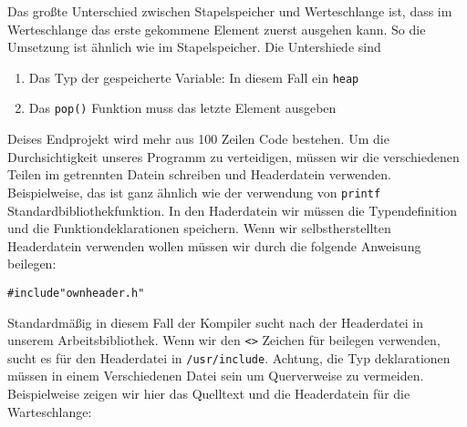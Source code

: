 Das großte Unterschied zwischen Stapelspeicher und 
Werteschlange ist, dass im Werteschlange das erste gekommene Element zuerst ausgehen kann. 
So die Umsetzung ist ähnlich wie im Stapelspeicher. Die Untershiede sind
\begin{enumerate}
\item Das Typ der gespeicherte Variable: In diesem Fall ein \texttt{heap}
\item Das \texttt{pop()} Funktion muss das letzte Element ausgeben
\end{enumerate}

Deises Endprojekt wird mehr aus 100 Zeilen Code bestehen.
Um die Durchsichtigkeit unseres Programm zu verteidigen, müssen
wir die verschiedenen Teilen im getrennten Datein schreiben und
Headerdatein verwenden. Beispielweise, das ist ganz ähnlich wie der 
verwendung von \texttt{printf} Standardbibliothekfunktion. In den Haderdatein
wir müssen die Typendefinition und die Funktiondeklarationen speichern.
Wenn wir selbstherstellten Headerdatein verwenden wollen müssen wir durch die
folgende Anweisung beilegen:
\begin{lstlisting}
#include"ownheader.h"
\end{lstlisting}
Standardmäßig in diesem Fall der Kompiler sucht nach der Headerdatei in unserem
Arbeitsbibliothek. Wenn wir den \texttt{<>} Zeichen für beilegen verwenden, sucht
es für den Headerdatei in \texttt{/usr/include}.
Achtung, 
die Typ deklarationen müssen in einem Verschiedenen Datei sein um Querverweise zu vermeiden.
Beispielweise zeigen wir hier das Quelltext und die Headerdatein für die Warteschlange:

